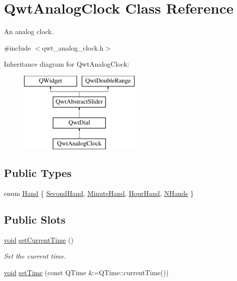 \hypertarget{class_qwt_analog_clock}{\section{Qwt\-Analog\-Clock Class Reference}
\label{class_qwt_analog_clock}
}


An analog clock.  




{\ttfamily \#include $<$qwt\-\_\-analog\-\_\-clock.\-h$>$}

Inheritance diagram for Qwt\-Analog\-Clock\-:\begin{figure}[H]
\begin{center}
\leavevmode
\includegraphics[height=4.000000cm]{class_qwt_analog_clock}
\end{center}
\end{figure}
\subsection*{Public Types}
\begin{DoxyCompactItemize}
\item 
enum \hyperlink{class_qwt_analog_clock_acd8f7e963ae073120684de46821f2cfe}{Hand} \{ \hyperlink{class_qwt_analog_clock_acd8f7e963ae073120684de46821f2cfea2d9426a775588d3afb667ca8e9393c8d}{Second\-Hand}, 
\hyperlink{class_qwt_analog_clock_acd8f7e963ae073120684de46821f2cfea024c7bee0110b50aad1bfffe6f468744}{Minute\-Hand}, 
\hyperlink{class_qwt_analog_clock_acd8f7e963ae073120684de46821f2cfea1e8f73f647c5a95ca062a8d63376982a}{Hour\-Hand}, 
\hyperlink{class_qwt_analog_clock_acd8f7e963ae073120684de46821f2cfea004c9f49b4271e02f350bccd21235ecd}{N\-Hands}
 \}
\end{DoxyCompactItemize}
\subsection*{Public Slots}
\begin{DoxyCompactItemize}
\item 
\hyperlink{group___u_a_v_objects_plugin_ga444cf2ff3f0ecbe028adce838d373f5c}{void} \hyperlink{class_qwt_analog_clock_a1972a54ce59155ec7435103f11a775a7}{set\-Current\-Time} ()
\begin{DoxyCompactList}\small\item\em Set the current time. \end{DoxyCompactList}\item 
\hyperlink{group___u_a_v_objects_plugin_ga444cf2ff3f0ecbe028adce838d373f5c}{void} \hyperlink{class_qwt_analog_clock_a7a7098a41511a4b1c819cfc8b0f2839c}{set\-Time} (const Q\-Time \&=Q\-Time\-::current\-Time())
\end{DoxyCompactItemize}
